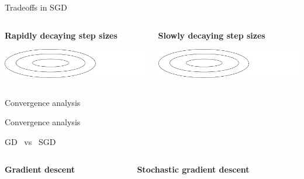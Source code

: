 \documentclass{beamer}
\begin{document}
\begin{frame}[t]{Tradeoffs in SGD}
	\grid

	\begin{columns}
		\begin{column}{0.45\textwidth}
			\vspace{-0.5cm}
			\begin{center}
				\textbf{Rapidly decaying step sizes}
			\end{center}
			\hspace*{-0.4cm}\includegraphics[width=9cm]{../figures/contour.pdf}
			\vspace{7cm}
	\end{column}
	\vrule
		\begin{column}{0.55\textwidth}
			\vspace{-0.5cm}
			\begin{center}
				\textbf{Slowly decaying step sizes}
			\end{center}
			\hspace*{0.4cm}\includegraphics[width=9cm]{../figures/contour.pdf}
			\vspace{7cm}
	\end{column}
	\end{columns}

\end{frame}


\begin{frame}[t]{Convergence analysis}
	\grid

\end{frame}
\begin{frame}[t]{Convergence analysis}
	\grid

\end{frame}
\begin{frame}[t]{GD \ vs \ SGD}
	\grid

	\begin{columns}
		\begin{column}{0.45\textwidth}
			\vspace{-0.5cm}
			\begin{center}
				\textbf{Gradient descent}
			\end{center}
			\vspace{7cm}
	\end{column}
	\vrule
		\begin{column}{0.55\textwidth}
			\vspace{-0.5cm}
			\begin{center}
				\textbf{Stochastic gradient descent}
			\end{center}
			\vspace{7cm}
	\end{column}
	\end{columns}

\end{frame}
\end{document}
